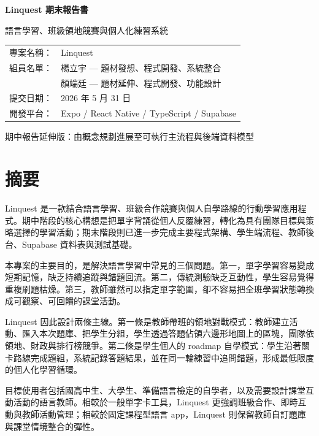\documentclass[12pt,a4paper]{article}
\begin{document}
\begin{titlepage}
  \pagecolor{linquestWarm}
  \centering
  \vspace*{2.4cm}
  {\Huge\bfseries\color{linquestGreen} Linquest 期末報告書\par}
  \vspace{0.8cm}
  {\Large 語言學習、班級領地競賽與個人化練習系統\par}
  \vspace{2cm}
  \begin{tabular}{rl}
    專案名稱： & Linquest \\
    組員名單： & 楊立宇 --- 題材發想、程式開發、系統整合 \\
              & 顏端廷 --- 題材延伸、程式開發、功能設計 \\
    提交日期： & 2026 年 5 月 31 日 \\
    開發平台： & Expo / React Native / TypeScript / Supabase \\
  \end{tabular}
  \vfill
  {\large 期中報告延伸版：由概念規劃進展至可執行主流程與後端資料模型\par}
  \nopagecolor
\end{titlepage}

\tableofcontents
\newpage

\section{摘要}

Linquest 是一款結合語言學習、班級合作競賽與個人自學路線的行動學習應用程式。期中階段的核心構想是把單字背誦從個人反覆練習，轉化為具有團隊目標與策略選擇的學習活動；期末階段則已進一步完成主要程式架構、學生端流程、教師後台、Supabase 資料表與測試基礎。

本專案的主要目的，是解決語言學習中常見的三個問題。第一，單字學習容易變成短期記憶，缺乏持續追蹤與錯題回流。第二，傳統測驗缺乏互動性，學生容易覺得重複刷題枯燥。第三，教師雖然可以指定單字範圍，卻不容易把全班學習狀態轉換成可觀察、可回饋的課堂活動。

Linquest 因此設計兩條主線。第一條是教師帶班的領地對戰模式：教師建立活動、匯入本次題庫、把學生分組，學生透過答題佔領六邊形地圖上的區塊，團隊依領地、財政與排行榜競爭。第二條是學生個人的 roadmap 自學模式：學生沿著關卡路線完成題組，系統記錄答題結果，並在同一輪練習中追問錯題，形成最低限度的個人化學習循環。

目標使用者包括國高中生、大學生、準備語言檢定的自學者，以及需要設計課堂互動活動的語言教師。相較於一般單字卡工具，Linquest 更強調班級合作、即時互動與教師活動管理；相較於固定課程型語言 app，Linquest 則保留教師自訂題庫與課堂情境整合的彈性。
\end{document}
